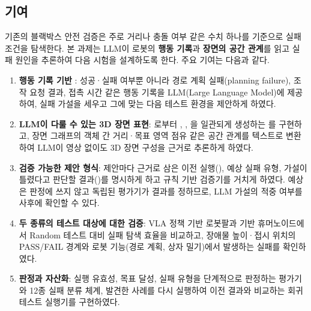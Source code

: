 \subsection*{기여}
기존의 블랙박스 안전 검증은 주로 거리나 충돌 여부 같은 수치 하나를 기준으로 실패 조건을 탐색한다.
본 과제는 LLM이 로봇의 \textbf{행동 기록}과 \textbf{장면의 공간 관계}를 읽고 실패 원인을 추론하여 다음 시험을 설계하도록 한다. 
주요 기여는 다음과 같다.
\begin{enumerate}
\item \textbf{행동 기록 기반 }: 성공·실패 여부뿐 아니라 경로 계획 실패(planning failure), 조작 요청 결과, 접촉 시간 같은 행동 기록을 LLM(Large Language Model)에 제공하여, 실패 가설을 세우고 그에 맞는 다음 테스트 환경을 제안하게 하였다.
\item \textbf{LLM이 다룰 수 있는 3D 장면 표현}: 로부터 , , 을 일관되게 생성하는 를 구현하고, 장면 그래프의 객체 간 거리·목표 영역 점유 같은 공간 관계를 텍스트로 변환하여 LLM이 영상 없이도 3D 장면 구성을 근거로 추론하게 하였다.
\item \textbf{검증 가능한 제안 형식}: 제안마다 근거로 삼은 이전 실행(), 예상 실패 유형, 가설이 틀렸다고 판단할 결과()를 명시하게 하고 규칙 기반 검증기를 거치게 하였다. 예상은 판정에 쓰지 않고 독립된 평가기가 결과를 정하므로, LLM 가설의 적중 여부를 사후에 확인할 수 있다.
\item \textbf{두 종류의 테스트 대상에 대한 검증}: VLA 정책 기반 로봇팔과  기반 휴머노이드에서 Random 테스트 대비 실패 탐색 효율을 비교하고, 장애물 높이·접시 위치의 PASS/FAIL 경계와 로봇 기능(경로 계획, 상자 밀기)에서 발생하는 실패를 확인하였다.
\item \textbf{판정과  자산화}: 실행 유효성, 목표 달성, 실패 유형을 단계적으로 판정하는 평가기와 12종 실패 분류 체계, 발견한 사례를 다시 실행하여 이전 결과와 비교하는 회귀 테스트 실행기를 구현하였다.
\end{enumerate}
